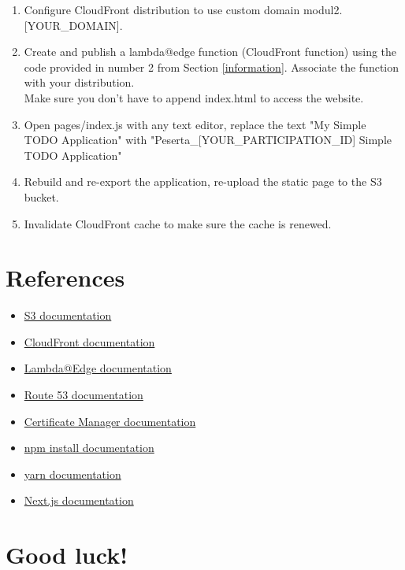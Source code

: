 \documentclass{article}
\begin{document}
\begin{enumerate}
    \item Configure CloudFront distribution to use custom domain modul2.[YOUR\_DOMAIN].
    \item Create and publish a lambda@edge function (CloudFront function) using the code provided in number 2 from Section \ref{information}. Associate the function with your distribution.\\
    Make sure you don't have to append index.html to access the website.
    \item Open pages/index.js with any text editor, replace the text "My Simple TODO Application" with "Peserta\_[YOUR\_PARTICIPATION\_ID] Simple TODO Application"
    \item Rebuild and re-export the application, re-upload the static page to the S3 bucket.
    \item Invalidate CloudFront cache to make sure the cache is renewed.
\end{enumerate}
\section{References}\label{references}
\begin{itemize}
\item \href{https://docs.aws.amazon.com/AmazonS3/latest/userguide/Welcome.html}{S3 documentation}
\item \href{https://docs.aws.amazon.com/AmazonCloudFront/latest/DeveloperGuide/Introduction.html}{CloudFront documentation}
\item \href{https://docs.aws.amazon.com/AmazonCloudFront/latest/DeveloperGuide/lambda-at-the-edge.html}{Lambda@Edge documentation}
\item \href{https://docs.aws.amazon.com/Route53/latest/DeveloperGuide/Welcome.html}{Route 53 documentation}
\item \href{https://docs.aws.amazon.com/acm/latest/userguide/acm-overview.html}{Certificate Manager documentation}
\item \href{https://docs.npmjs.com/cli/v8/commands/npm-install}{npm install documentation}
\item \href{https://classic.yarnpkg.com/en/docs}{yarn documentation}
\item \href{https://nextjs.org/docs/deployment}{Next.js documentation}
\end{itemize}

\section*{Good luck!}
\end{document}
